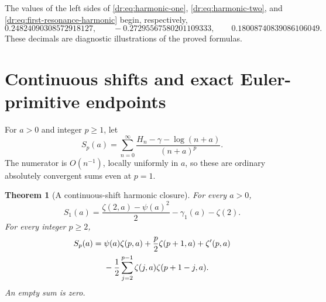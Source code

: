 \documentclass[11pt,letterpaper]{article}
\numberwithin{equation}{section}
\newtheorem{theorem}{Theorem}[section]
\theoremstyle{definition}
\theoremstyle{remark}
\begin{document}
The values of the left sides of \eqref{dr:eq:harmonic-one},
\eqref{dr:eq:harmonic-two}, and \eqref{dr:eq:first-resonance-harmonic}
begin, respectively,
\[
 0.24824090308572918127,\qquad
 -0.27295567580201109333,\qquad
 0.18008740839086106049.
\]
These decimals are diagnostic illustrations of the proved formulas.

\section{Continuous shifts and exact Euler-primitive endpoints}
\label{dr:sec:harmonic-primitives}

For $a>0$ and integer $p\geq1$, let
\begin{equation}
 S_p(a)=\sum_{n=0}^{\infty}
       \frac{H_n-\gamma-\log(n+a)}{(n+a)^p}.
 \label{dr:eq:Sp}
\end{equation}
The numerator is $O(n^{-1})$, locally uniformly in $a$, so these are
ordinary absolutely convergent sums even at $p=1$.

\begin{theorem}[A continuous-shift harmonic closure]
\label{dr:thm:Sp}
For every $a>0$,
\begin{equation}
 S_1(a)=\frac{\zeta(2,a)-\psi(a)^2}{2}-\gamma_1(a)-\zeta(2).
 \label{dr:eq:S1-general}
\end{equation}
For every integer $p\geq2$,
\begin{align}
 S_p(a)={}&\psi(a)\zeta(p,a)+\frac p2\zeta(p+1,a)
              +\zeta'(p,a)\notag\\
 &-\frac12\sum_{j=2}^{p-1}\zeta(j,a)\zeta(p+1-j,a).
 \label{dr:eq:Sp-general}
\end{align}
An empty sum is zero.
\end{theorem}
\end{document}
